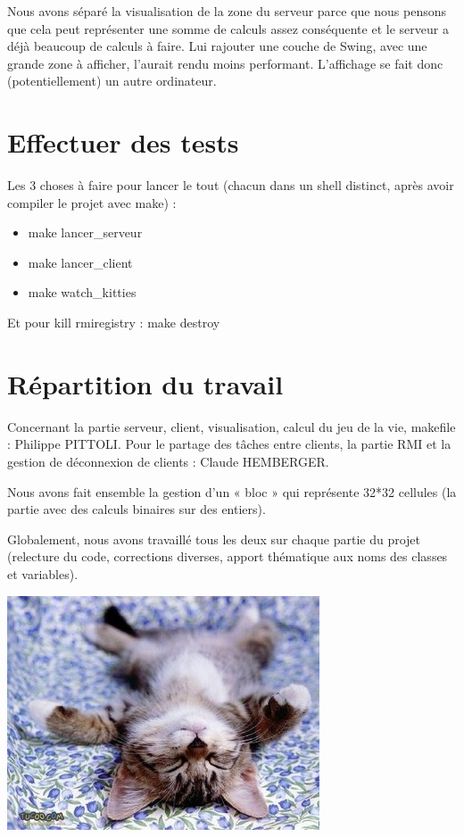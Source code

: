 \documentclass[twoside]{article}
\begin{document}
Nous avons séparé la visualisation de la zone du serveur parce que nous pensons que cela peut représenter une somme de calculs assez conséquente et le serveur a déjà beaucoup de calculs à faire. 
Lui rajouter une couche de Swing, avec une grande zone à afficher, l'aurait rendu moins performant.
L'affichage se fait donc (potentiellement) un autre ordinateur.

\section{Effectuer des tests}
Les 3 choses à faire pour lancer le tout (chacun dans un shell distinct, après avoir compiler le projet avec make) :
\begin{itemize}
	\item make lancer\_serveur
	\item make lancer\_client
	\item make watch\_kitties
\end{itemize}
Et pour kill rmiregistry :
	make destroy

\section{Répartition du travail}
Concernant la partie serveur, client, visualisation, calcul du jeu de la vie, makefile : Philippe PITTOLI.
Pour le partage des tâches entre clients, la partie RMI et la gestion de déconnexion de clients : Claude HEMBERGER.

Nous avons fait ensemble la gestion d'un « bloc » qui représente 32*32 cellules (la partie avec des calculs binaires sur des entiers).

Globalement, nous avons travaillé tous les deux sur chaque partie du projet (relecture du code, corrections diverses, apport thématique aux noms des classes et variables).

\begin{center} 
	\includegraphics[scale=0.5]{img/chaton.jpg}
\end{center}
\end{document}
